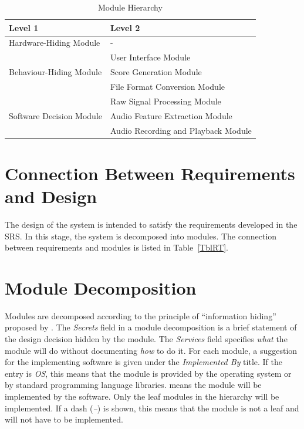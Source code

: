 \documentclass[12pt, titlepage]{article}
\begin{document}
\begin{table}[h!]
  \centering
  \begin{tabular}{p{} p{}}
  \toprule
  \textbf{Level 1} & \textbf{Level 2}\\
  \midrule
  
  {Hardware-Hiding Module} & -\\
  \midrule
  
  \multirow{3}{0.3\textwidth}{Behaviour-Hiding Module} 
  & User Interface Module \\
  & Score Generation Module \\
  & File Format Conversion Module \\
  \midrule
  
  \multirow{3}{0.3\textwidth}{Software Decision Module} 
  & Raw Signal Processing Module \\
  & Audio Feature Extraction Module \\
  & Audio Recording and Playback Module \\
  \bottomrule
  
  \end{tabular}
  \caption{Module Hierarchy}
  \label{TblMH}
\end{table}
  

\section{Connection Between Requirements and Design} \label{SecConnection}

The design of the system is intended to satisfy the requirements developed in
the SRS. In this stage, the system is decomposed into modules. The connection
between requirements and modules is listed in Table~\ref{TblRT}.

\section{Module Decomposition} \label{SecMD}

Modules are decomposed according to the principle of ``information hiding''
proposed by \citep{ParnasEtAl1984} . The \emph{Secrets} field in a module
decomposition is a brief statement of the design decision hidden by the
module. The \emph{Services} field specifies \emph{what} the module will do
without documenting \emph{how} to do it. For each module, a suggestion for the
implementing software is given under the \emph{Implemented By} title. If the
entry is \emph{OS}, this means that the module is provided by the operating
system or by standard programming language libraries. \emph{\progname{}} means the
module will be implemented by the \progname{} software.
Only the leaf modules in the hierarchy will be implemented. If a dash
(\emph{--}) is shown, this means that the module is not a leaf and will not have
to be implemented.
\end{document}
